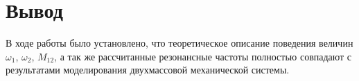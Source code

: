 \section{Вывод}

В ходе работы было установлено, что теоретическое описание поведения величин  $\omega_1$, $\omega_2$, $M_{12}$, а так же рассчитанные резонансные частоты полностью совпадают с результатами моделирования двухмассовой механической системы.
